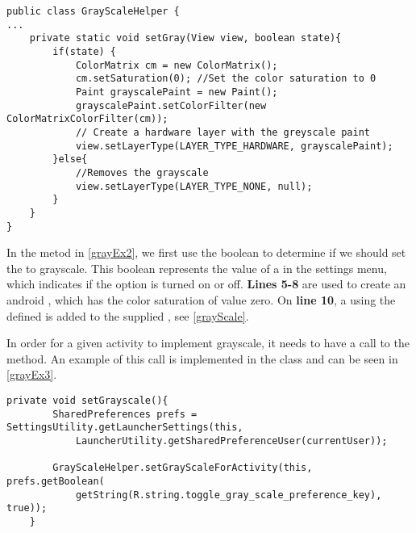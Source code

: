 \begin{minipage}[H]{\linewidth}
\begin{lstlisting}[caption = Method used to change to color saturation of views., label = grayEx2]
public class GrayScaleHelper {
...
    private static void setGray(View view, boolean state){
        if(state) {
            ColorMatrix cm = new ColorMatrix();
            cm.setSaturation(0); //Set the color saturation to 0
            Paint grayscalePaint = new Paint();
            grayscalePaint.setColorFilter(new ColorMatrixColorFilter(cm));
            // Create a hardware layer with the greyscale paint
            view.setLayerType(LAYER_TYPE_HARDWARE, grayscalePaint);
        }else{
            //Removes the grayscale
            view.setLayerType(LAYER_TYPE_NONE, null);
        }
    }
}
\end{lstlisting}
\end{minipage}

In the  metod in \autoref{grayEx2}, we first use the boolean
 to determine if we should set the  to grayscale. This
boolean represents the value of a  in the settings menu,
which indicates if the option is turned on or off. \textbf{Lines 5-8} are used
to create an android , which has the color saturation of value
zero. On \textbf{line 10}, a  using the defined
 is added to the supplied , see
\autoref{grayScale}.\nl


In order for a given activity to implement grayscale, it needs to have a call to
the  method. An example of this call is
implemented in the  class and can be seen in
\autoref{grayEx3}.\nl

\begin{minipage}[H]{\linewidth}
\begin{lstlisting}[caption = Setting grayscale by calling the setGrayScaleForActivity method, label = grayEx3] 
private void setGrayscale(){
        SharedPreferences prefs = SettingsUtility.getLauncherSettings(this,
            LauncherUtility.getSharedPreferenceUser(currentUser));

        GrayScaleHelper.setGrayScaleForActivity(this, prefs.getBoolean(
            getString(R.string.toggle_gray_scale_preference_key), true));
    }
\end{lstlisting}
\end{minipage}

